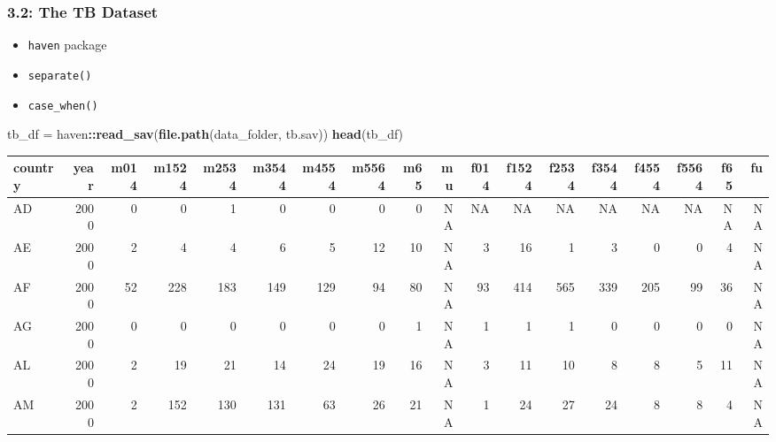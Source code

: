 \documentclass[
]{article}
\newenvironment{Shaded}{\begin{snugshade}}{\end{snugshade}}
\newcommand{\KeywordTok}[1]{\textcolor[rgb]{0.13,0.29,0.53}{\textbf{#1}}}
\newcommand{\NormalTok}[1]{#1}
\newcommand{\OperatorTok}[1]{\textcolor[rgb]{0.81,0.36,0.00}{\textbf{#1}}}
\newcommand{\StringTok}[1]{\textcolor[rgb]{0.31,0.60,0.02}{#1}}
\providecommand{\tightlist}{%
  \setlength{\itemsep}{0pt}\setlength{\parskip}{0pt}}
\begin{document}
\hypertarget{the-tb-dataset}{%
\subsubsection{3.2: The TB Dataset}\label{the-tb-dataset}}

\begin{itemize}
\tightlist
\item
  \texttt{haven} package
\item
  \texttt{separate()}
\item
  \texttt{case\_when()}
\end{itemize}

\begin{Shaded}
\begin{Highlighting}[]
\NormalTok{tb\_df =}\StringTok{ }\NormalTok{haven}\OperatorTok{::}\KeywordTok{read\_sav}\NormalTok{(}\KeywordTok{file.path}\NormalTok{(data\_folder, }\StringTok{\textquotesingle{}tb.sav\textquotesingle{}}\NormalTok{))}
\KeywordTok{head}\NormalTok{(tb\_df)}
\end{Highlighting}
\end{Shaded}

\begin{tabular}{l|r|r|r|r|r|r|r|r|r|r|r|r|r|r|r|r|r}
\hline
country & year & m014 & m1524 & m2534 & m3544 & m4554 & m5564 & m65 & mu & f014 & f1524 & f2534 & f3544 & f4554 & f5564 & f65 & fu\\
\hline
AD & 2000 & 0 & 0 & 1 & 0 & 0 & 0 & 0 & NA & NA & NA & NA & NA & NA & NA & NA & NA\\
\hline
AE & 2000 & 2 & 4 & 4 & 6 & 5 & 12 & 10 & NA & 3 & 16 & 1 & 3 & 0 & 0 & 4 & NA\\
\hline
AF & 2000 & 52 & 228 & 183 & 149 & 129 & 94 & 80 & NA & 93 & 414 & 565 & 339 & 205 & 99 & 36 & NA\\
\hline
AG & 2000 & 0 & 0 & 0 & 0 & 0 & 0 & 1 & NA & 1 & 1 & 1 & 0 & 0 & 0 & 0 & NA\\
\hline
AL & 2000 & 2 & 19 & 21 & 14 & 24 & 19 & 16 & NA & 3 & 11 & 10 & 8 & 8 & 5 & 11 & NA\\
\hline
AM & 2000 & 2 & 152 & 130 & 131 & 63 & 26 & 21 & NA & 1 & 24 & 27 & 24 & 8 & 8 & 4 & NA\\
\hline
\end{tabular}
\end{document}
